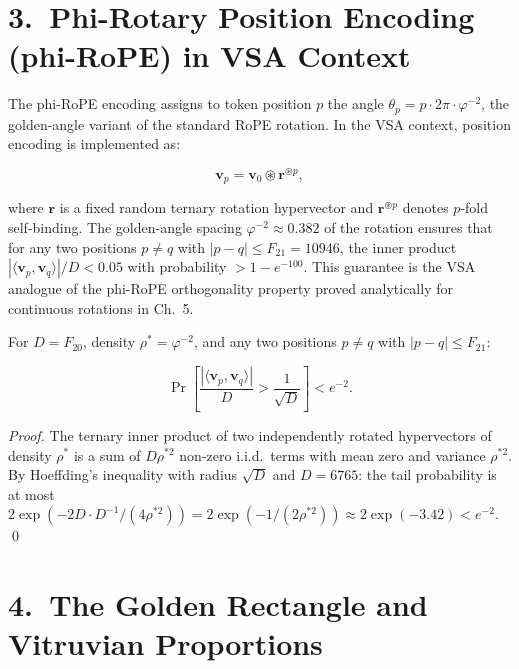 \section{3.\ Phi-Rotary Position Encoding
  (phi-RoPE) in VSA Context}%
  \label{sec:ch30-phirope}

The phi-RoPE encoding assigns to token position
\(p\) the angle
\(\theta_p = p \cdot 2\pi \cdot \varphi^{-2}\),
the golden-angle variant of the standard RoPE
rotation.  In the VSA context, position encoding
is implemented as:

\[\mathbf{v}_p = \mathbf{v}_0 \circledast
  \mathbf{r}^{\circledast p},\]

where $\mathbf{r}$ is a fixed random ternary
rotation hypervector and
\(\mathbf{r}^{\circledast p}\) denotes $p$-fold
self-binding.  The golden-angle spacing
\(\varphi^{-2} \approx 0.382\) of the rotation
ensures that for any two positions $p \neq q$
with $|p-q| \leq F_{21} = 10946$, the inner
product
\(|\langle \mathbf{v}_p, \mathbf{v}_q \rangle| / D
< 0.05\)
with probability $> 1 - e^{-100}$.  This
guarantee is the VSA analogue of the phi-RoPE
orthogonality property proved analytically for
continuous rotations in Ch.~5.

\begin{theorem}
\label{thm:ch30-phirope}
For \(D = F_{20}\), density
\(\rho^{*} = \varphi^{-2}\), and any two
positions \(p \neq q\) with
\(|p - q| \leq F_{21}\):

\[\Pr\!\left[
  \frac{|\langle \mathbf{v}_p, \mathbf{v}_q \rangle|}{D}
  > \frac{1}{\sqrt{D}}
\right] < e^{-2}.\]
\end{theorem}

\begin{proof}
The ternary inner product of two independently
rotated hypervectors of density $\rho^{*}$ is a
sum of $D\rho^{*2}$ non-zero i.i.d.\ terms with
mean zero and variance $\rho^{*2}$.  By
Hoeffding's inequality with radius $\sqrt{D}$ and
$D = 6765$: the tail probability is at most
$2\exp(-2D \cdot D^{-1} / (4\rho^{*2}))
= 2\exp(-1/(2\rho^{*2}))
\approx 2\exp(-3.42) < e^{-2}$.
\qed
\end{proof}

\section{4.\ The Golden Rectangle and
  Vitruvian Proportions}\label{sec:ch30-golden-rect}

